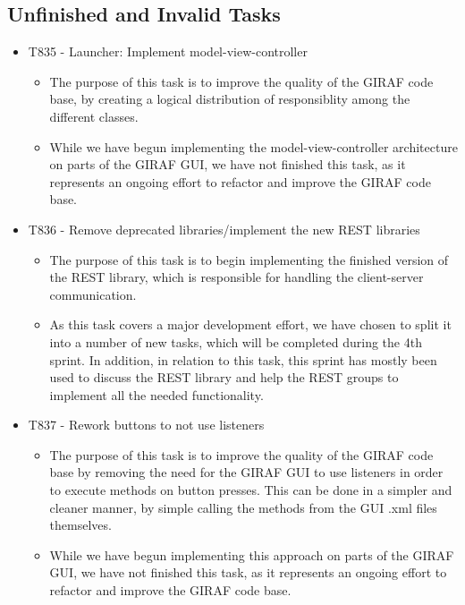 \subsection{Unfinished and Invalid Tasks}\label{S2Invalid}
\begin{itemize}
  \item T835 - Launcher: Implement model-view-controller
  \begin{itemize}
  	\item The purpose of this task is to improve the quality of the GIRAF code
  	base, by creating a logical distribution of responsiblity among the different
  	classes.
  	\item While we have begun implementing the model-view-controller architecture
  	on parts of the GIRAF GUI, we have not finished this task, as it represents
  	an ongoing effort to refactor and improve the GIRAF code base.
  \end{itemize}
  \item T836 - Remove deprecated libraries/implement the new REST libraries
  \begin{itemize}
  	\item The purpose of this task is to begin implementing the finished version
  	of the REST library, which is responsible for handling the client-server
  	communication.
  	\item As this task covers a major development effort, we have chosen to split
  	it into a number of new tasks, which will be completed during the 4th sprint.
  	In addition, in relation to this task, this sprint has mostly been used to
  	discuss the REST library and help the REST groups to implement all the needed
  	functionality.  
  	\end{itemize}
  \item T837 - Rework buttons to not use listeners
  \begin{itemize}
    \item The purpose of this task is to improve the quality of the GIRAF code
    base by removing the need for the GIRAF GUI to use listeners in order to
    execute methods on button presses. This can be done in a simpler and cleaner
    manner, by simple calling the methods from the GUI .xml files themselves.
    \item While we have begun implementing this approach on parts of the GIRAF
    GUI, we have not finished this task, as it represents an ongoing effort to
    refactor and improve the GIRAF code base.
  \end{itemize}
\end{itemize}

